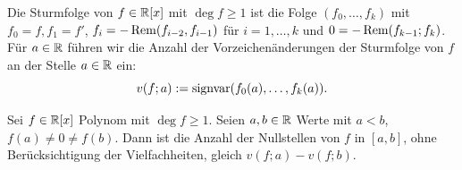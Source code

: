 \documentclass[11pt]{article}
\numberwithin{equation}{section}
\begin{document}
\begin{definition} 
	Die Sturmfolge von $f \in \mathbb{R}[x]$ mit $\deg f \ge 1$ ist die Folge $(f_0,\ldots,f_k)$ mit $f_0 = f, f_1 = f'$, $f_i =  - \operatorname{Rem}(f_{i-2},f_{i-1})$ für $i=1,\ldots,k$ und $ 0 = - \operatorname{Rem}(f_{k-1};f_k)$. Für $a \in \mathbb{R}$ führen wir die Anzahl der Vorzeichenänderungen der Sturmfolge von $f$ an der Stelle $a \in \mathbb{R}$ ein: 
	\[
			v(f;a) := \operatorname{signvar}(f_0(a),\ldots,f_k(a)). 
	\]
\end{definition} 

\begin{theorem}[Sturm] 
	Sei $f \in \mathbb{R}[x]$ Polynom mit $\deg f \ge 1$. Seien $a, b \in \mathbb{R}$ Werte mit $a< b$, $f(a) \ne 0 \ne f(b)$. Dann ist die Anzahl der Nullstellen von $f$ in $[a,b]$, ohne Berücksichtigung der Vielfachheiten, gleich $v(f;a) - v(f;b)$. 
\end{theorem} 
\end{document}
